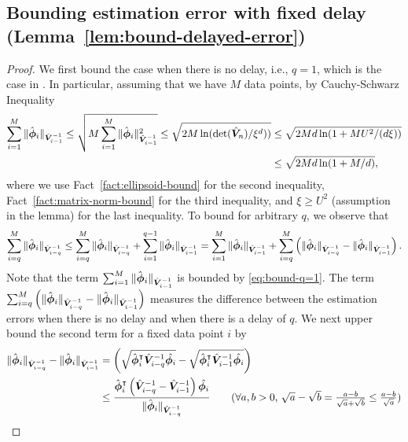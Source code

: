 \subsection{Bounding estimation error with fixed delay (Lemma~\ref{lem:bound-delayed-error})}\label{app:lem-bound-delayed-error}
\begin{proof}
We first bound the case when there is no delay, i.e., $q = 1$, which is the case in \cite{Abbasi-YadkoriPS11}. In particular, assuming that we have $M$ data points, by Cauchy-Schwarz Inequality
\begin{align}
\sum_{i=1}^M \|\hat{\boldsymbol{\phi}}_i\|_{\hat{\boldsymbol{V}}_{i-1}^{-1}} \leq \sqrt{M\sum_{i=1}^M \|\hat{\boldsymbol{\phi}}_i\|_{\hat{\boldsymbol{V}}_{i-1}^{-1}}^2} \leq \sqrt{2M\ln(\det(\hat{\boldsymbol{V}}_n) / \xi^d))} &\leq  \sqrt{2Md\ln(1+MU^2/(d\xi))} \nonumber\\
&\leq \sqrt{2Md\ln(1+M/d)}, \label{eq:bound-q=1}
\end{align}
where we use Fact~\ref{fact:ellipsoid-bound} for the second inequality, Fact~\ref{fact:matrix-norm-bound} for the third inequality, and $\xi \geq U^2$ (assumption in the lemma) for the last inequality. To bound for arbitrary $q$, we observe that 
\begin{equation}\label{eq:trans-q-to-1}
\sum_{i=q}^M \|\hat{\boldsymbol{\phi}}_i\|_{\hat{\boldsymbol{V}}_{i-q}^{-1}} \leq \sum_{i=q}^M \|\hat{\boldsymbol{\phi}}_i\|_{\hat{\boldsymbol{V}}_{i-q}^{-1}} + \sum_{i=1}^{q-1} \|\hat{\boldsymbol{\phi}}_i\|_{\hat{\boldsymbol{V}}_{i-1}^{-1}} =  \sum_{i=1}^M\|\hat{\boldsymbol{\phi}}_i\|_{\hat{\boldsymbol{V}}_{i-1}^{-1}} + \sum_{i=q}^M \left(\|\hat{\boldsymbol{\phi}}_i\|_{\hat{\boldsymbol{V}}_{i-q}^{-1}} - \|\hat{\boldsymbol{\phi}}_i\|_{\hat{\boldsymbol{V}}_{i-1}^{-1}}\right).
\end{equation}
Note that the term $\sum_{i=1}^M\|\hat{\boldsymbol{\phi}}_i\|_{\hat{\boldsymbol{V}}_{i-1}^{-1}}$ is bounded by \eqref{eq:bound-q=1}. The term $\sum_{i=q}^M \left(\|\hat{\boldsymbol{\phi}}_i\|_{\hat{\boldsymbol{V}}_{i-q}^{-1}} - \|\hat{\boldsymbol{\phi}}_i\|_{\hat{\boldsymbol{V}}_{i-1}^{-1}}\right)$ measures the difference between the estimation errors when there is no delay and when there is a delay of $q$. We next upper bound the second term for a fixed data point $i$ by 
\begin{align}
\|\hat{\bphi}_i\|_{\hat{\bV}_{i-q}^{-1}} - \|\hat{\bphi}_i\|_{\hat{\bV}_{i-1}^{-1}} &= \left(\sqrt{\hat{\bphi}_i^{\trans}\hat{\bV}_{i-q}^{-1}\hat{\bphi_i}} - \sqrt{\hat{\bphi}_i^{\trans}\hat{\bV}_{i-1}^{-1}\hat{\bphi_i}}\right) \nonumber\\
&\leq \frac{\hat{\bphi}_i^{\trans}\left(\hat{\bV}_{i-q}^{-1}-\hat{\bV}_{i-1}^{-1}\right)\hat{\bphi_i}}{\|\hat{\bphi}_i\|_{\hat{\bV}_{i-q}^{-1}}} \tag{$\forall a,b > 0$, $\sqrt{a} - \sqrt{b} =\frac{a-b}{\sqrt{a}+\sqrt{b}} \leq \frac{a-b}{\sqrt{a}}$} \nonumber\\

\end{align}
\end{proof}
